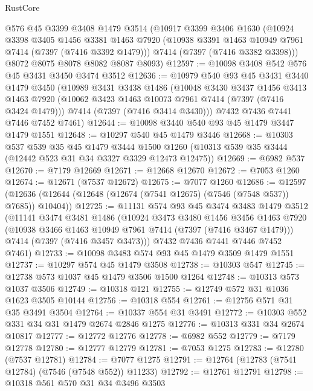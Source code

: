 \begin{lexlean}{RustCore}
\begin{coremodule}
    @576
    @45
    @3399
    @3408
    @1479
    @3514
    (@10917
      @3399
      @3406
      @1630
      (@10924
        @3398
        @3405
        @1456
        @3381
        @1463
        @7920
        (@10938 @3391 @1463 @10949 @7961 @7414 (@7397 (@7416 @3392 @1479)))
        @7414
        (@7397 (@7416 @3382 @3398)))
      @8072
      @8075
      @8078
      @8082
      @8087
      @8093)
@12597 := @10098 @3408 @542 @576 @45 @3431 @3450 @3474 @3512
@12636 := @10979
    @540
    @93
    @45
    @3431
    @3440
    @1479
    @3450
    (@10989
      @3431
      @3438
      @1486
      (@10048
        @3430
        @3437
        @1456
        @3413
        @1463
        @7920
        (@10062 @3423 @1463 @10073 @7961 @7414 (@7397 (@7416 @3424 @1479)))
        @7414
        (@7397 (@7416 @3414 @3430)))
      @7432
      @7436
      @7441
      @7446
      @7452
      @7461)
@12644 := @10098 @3440 @540 @93 @45 @1479 @3447 @1479 @1551
@12648 := @10297 @540 @45 @1479 @3446
@12668 := @10303
    @537
    @539
    @35
    @45
    @1479
    @3444
    @1500
    @1260
    (@10313 @539 @35 @3444 (@12442 @523 @31 @34 @3327 @3329 @12473 @12475))
@12669 := @6982 @537
@12670 := @7179 @12669
@12671 := @12668 @12670
@12672 := @7053 @1260
@12674 := @12671 (@7537 @12672)
@12675 := @7077 @1260
@12686 := @12597
    (@12636 (@12644 (@12648 (@12674 (@7541 @12675) (@7546 (@7548 @537)) @7685)) @10404))
@12725 := @11131
    @574
    @93
    @45
    @3474
    @3483
    @1479
    @3512
    (@11141
      @3474
      @3481
      @1486
      (@10924
        @3473
        @3480
        @1456
        @3456
        @1463
        @7920
        (@10938 @3466 @1463 @10949 @7961 @7414 (@7397 (@7416 @3467 @1479)))
        @7414
        (@7397 (@7416 @3457 @3473)))
      @7432
      @7436
      @7441
      @7446
      @7452
      @7461)
@12733 := @10098 @3483 @574 @93 @45 @1479 @3509 @1479 @1551
@12737 := @10297 @574 @45 @1479 @3508
@12738 := @10303 @547
@12745 := @12738 @573 @1037 @45 @1479 @3506 @1500 @1264
@12748 := @10313 @573 @1037 @3506
@12749 := @10318 @121
@12755 := @12749 @572 @31 @1036 @1623 @3505 @10144
@12756 := @10318 @554
@12761 := @12756 @571 @31 @35 @3491 @3504
@12764 := @10337 @554 @31 @3491
@12772 := @10303 @552 @331 @34 @31 @1479 @2674 @2846 @1275
@12776 := @10313 @331 @34 @2674 @10817
@12777 := @12772 @12776
@12778 := @6982 @552
@12779 := @7179 @12778
@12780 := @12777 @12779
@12781 := @7053 @1275
@12783 := @12780 (@7537 @12781)
@12784 := @7077 @1275
@12791 := @12764 (@12783 (@7541 @12784) (@7546 (@7548 @552)) @11233)
@12792 := @12761 @12791
@12798 := @10318 @561 @570 @31 @34 @3496 @3503

\end{coremodule}
\end{lexlean}
